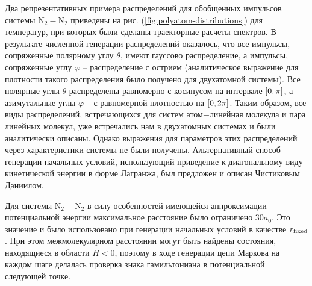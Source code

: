 Два репрезентативных примера распределений для обобщенных импульсов системы N$_2-$N$_2$  приведены на рис. (\ref{fig:polyatom-distributions}) для температур, при которых были сделаны траекторные расчеты спектров. В результате численной генерации распределений оказалось, что все импульсы, сопряженные полярному углу $\theta$, имеют гауссово распределение, а импульсы, сопряженные углу $\varphi$ -- распределение с острием (аналитическое выражение для плотности такого распределения было получено для двухатомной системы). Все полярные углы $\theta$ распределены равномерно с косинусом на интервале $\left[ 0, \pi \right]$, а азимутальные углы $\varphi$ -- с равномерной плотностью на $\left[ 0, 2\pi \right]$. Таким образом, все виды распределений, встречающихся для систем атом$-$линейная молекула и пара линейных молекул, уже встречались нам в двухатомных системах и были аналитически описаны. Однако выражения для параметров этих распределений через характеристики системы не были получены. Альтернативный способ генерации начальных условий, использующий приведение к диагональному виду кинетической энергии в форме Лагранжа, был предложен и описан Чистиковым Даниилом. \par
Для системы N$_2-$N$_2$ в силу особенностей имеющейся аппроксимации потенциальной энергии максимальное расстояние было ограничено $30 a_0$. Это значение и было использовано при генерации начальных условий в качестве $r_\text{fixed}$. При этом межмолекулярном расстоянии могут быть найдены состояния, находящиеся в области $H < 0$, поэтому в ходе генерации цепи Маркова на каждом шаге делалась проверка знака гамильтониана в потенциальной следующей точке. 

